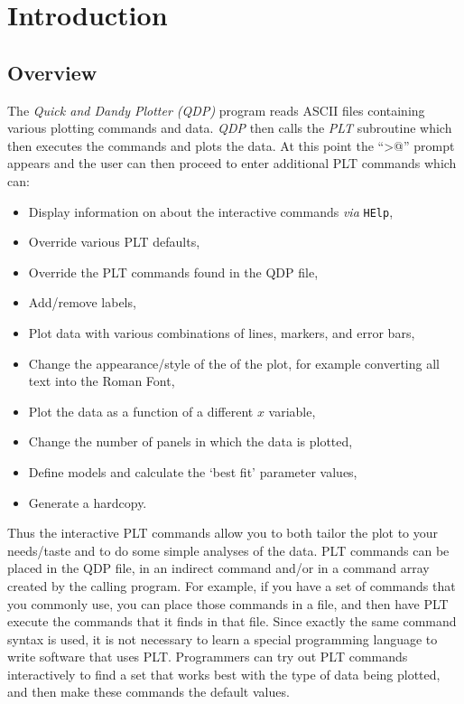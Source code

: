 \chapter{Introduction}

\section{Overview}

The {\em Quick and Dandy Plotter (QDP)} program reads ASCII files
containing various plotting commands and data.
{\em QDP} then calls the {\em PLT} subroutine which then executes
the commands and plots the data.
At this point the ``\verb@PLT>@'' prompt appears and the user can
then proceed to enter additional PLT commands which can:
\begin{itemize}
\item Display information on about the interactive commands
{\it via} {\tt HElp},

\item Override various PLT defaults,

\item Override the PLT commands found in the QDP file,

\item Add/remove labels,

\item Plot data with various combinations of lines, markers, and error bars,

\item Change the appearance/style of the of the plot, for example converting
all text into the Roman Font,

\item Plot the data as a function of a different $x$ variable,

\item Change the number of panels in which the data is plotted,

\item Define models and calculate the `best fit' parameter values,

\item Generate a hardcopy.
\end{itemize}

Thus the interactive PLT commands allow you to both
tailor the plot to your needs/taste and
to do some simple analyses of the data.
PLT commands can be placed in the QDP file, in an indirect command
and/or in a command array created by the calling program.
For example, if you have a set of commands that you commonly use,
you can place those commands in a file, and then have PLT
execute the commands that it finds in that file.
Since exactly the same command syntax is used, it is
not necessary to learn a special programming language to write software
that uses PLT.
Programmers can try out PLT commands interactively to find
a set that works best with the type of data being plotted,
and then make these commands the default values.

